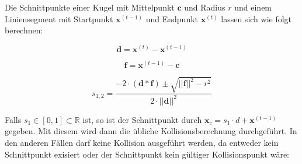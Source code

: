 Die Schnittpunkte einer Kugel mit Mittelpunkt $\textbf{c}$ und Radius $r$ und einem Liniensegment mit Startpunkt  $\textbf{x}^{(t-1)}$ und Endpunkt $\textbf{x}^{(t)}$ lassen sich wie folgt berechnen:

\hspace{-1cm}\begin{minipage}{.333333\linewidth}
	\begin{equation*}
	\textbf{d} = \textbf{x}^{(t)} - \textbf{x}^{(t-1)}
	\end{equation*}
\end{minipage}%
\begin{minipage}{.333333\linewidth}
	\begin{equation*}
	\textbf{f} = \textbf{x}^{(t-1)} - \textbf{c}
	\end{equation*}
\end{minipage}
\begin{minipage}{.333333\linewidth}
	\begin{equation*}
	s_{1,2} = \frac{-2 \cdot (\textbf{d} * \textbf{f}) \pm \sqrt{||\textbf{f}||^2 - r^2}}{2 \cdot ||\textbf{d}||^2}
	\end{equation*}
\end{minipage}
\vspace{0.3cm}

Falls $s_1 \in [0, 1] \subset \mathbb{R}$ ist, so ist der Schnittpunkt durch $\textbf{x}_c = s_1 \cdot d + \textbf{x}^{(t-1)}$ gegeben. 
Mit diesem wird dann die übliche Kollisionsberechnung durchgeführt.
In den anderen Fällen darf keine Kollision ausgeführt werden, da entweder kein Schnittpunkt exisiert oder der Schnittpunkt kein gültiger Kollisionspunkt wäre:

